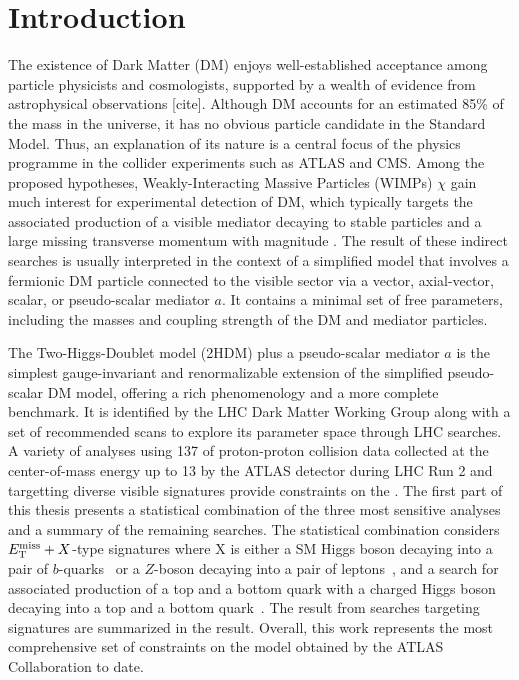  \chapter{Introduction}

The existence of Dark Matter (DM) enjoys well-established acceptance among particle physicists and cosmologists, supported by a wealth of evidence from astrophysical observations [cite]. 
Although DM accounts for an estimated 85\% of the mass in the universe, it has no obvious particle candidate in the Standard Model.
Thus, an explanation of its nature is a central focus of the physics programme in the collider experiments such as ATLAS and CMS. 
Among the proposed hypotheses, Weakly-Interacting Massive Particles (WIMPs) $\chi$ gain much interest for experimental detection of DM, which typically targets the associated production of a visible mediator decaying to stable particles and a large missing transverse momentum with magnitude \met.
The result of these indirect searches is usually interpreted in the context of a simplified model that involves a fermionic DM particle connected to the visible sector via a vector, axial-vector, scalar, or pseudo-scalar mediator $a$. 
It contains a minimal set of free parameters, including the masses and coupling strength of the DM and mediator particles. 

The Two-Higgs-Doublet model (2HDM) plus a pseudo-scalar mediator $a$ is the simplest gauge-invariant and renormalizable extension of the simplified pseudo-scalar DM model, offering a rich phenomenology and a more complete benchmark.
It is identified by the LHC Dark Matter Working Group along with a set of recommended scans to explore its parameter space through LHC searches. 
A variety of analyses using 137 \ifb of proton-proton collision data collected at the center-of-mass energy up to 13 \TeV by the ATLAS detector during LHC Run 2 and targetting diverse visible signatures provide constraints on the \thdma. 
The first part of this thesis presents a statistical combination of the three most sensitive analyses and a summary of the remaining searches.
The statistical combination considers $E_{\mathrm{T}}^{\mathrm{miss}}+X$-type signatures where X is either a SM Higgs boson decaying into a pair of $b$-quarks~\cite{EXOT-2018-46} or a $Z$-boson decaying into a pair of leptons~\cite{HIGG-2018-26}, and a search for associated production of a top and a bottom quark with a charged Higgs boson decaying into a top and a bottom quark~\cite{HDBS-2018-51}.
The result from searches targeting signatures are summarized in the result. 
Overall, this work represents the most comprehensive set of constraints on the model obtained by the ATLAS Collaboration to date. 

